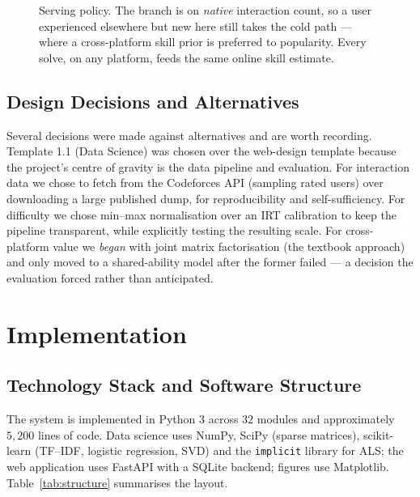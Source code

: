 \documentclass[12pt,a4paper]{article}
\begin{document}
\begin{figure}[h]
\caption{Serving policy. The branch is on \emph{native} interaction count, so a user
experienced elsewhere but new here still takes the cold path --- where a cross-platform
skill prior is preferred to popularity. Every solve, on any platform, feeds the same
online skill estimate.}
\label{fig:policy}
\end{figure}

\subsection{Design Decisions and Alternatives}
Several decisions were made against alternatives and are worth recording. Template 1.1
(Data Science) was chosen over the web-design template because the project's centre of
gravity is the data pipeline and evaluation. For interaction data we chose to fetch from
the Codeforces API (sampling rated users) over downloading a large published dump, for
reproducibility and self-sufficiency. For difficulty we chose min--max normalisation over
an IRT calibration to keep the pipeline transparent, while explicitly testing the
resulting scale. For cross-platform value we \emph{began} with joint matrix factorisation
(the textbook approach) and only moved to a shared-ability model after the former failed
--- a decision the evaluation forced rather than anticipated.

\section[Implementation \textnormal{\small(2,873 words)}]{Implementation}
\label{sec:impl}

\subsection{Technology Stack and Software Structure}
The system is implemented in Python 3 across $32$ modules and approximately $5{,}200$
lines of code. Data science uses NumPy, SciPy (sparse matrices), scikit-learn (TF--IDF,
logistic regression, SVD) and the \texttt{implicit} library for ALS; the web application
uses FastAPI with a SQLite backend; figures use Matplotlib. Table~\ref{tab:structure}
summarises the layout.
\end{document}
